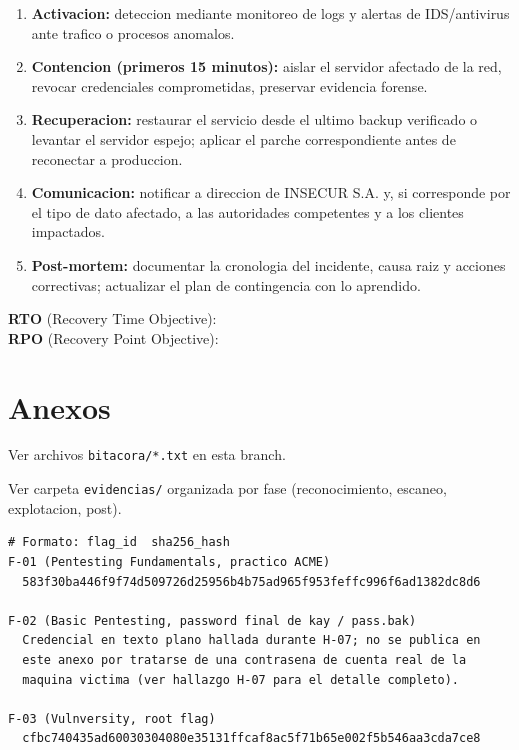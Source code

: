 \documentclass[11pt,a4paper]{article}
\begin{document}
\begin{campo}
\begin{enumerate}
  \item \textbf{Activacion:} deteccion mediante monitoreo de logs y alertas de IDS/antivirus ante trafico o procesos anomalos.
  \item \textbf{Contencion (primeros 15 minutos):} aislar el servidor afectado de la red, revocar credenciales comprometidas, preservar evidencia forense.
  \item \textbf{Recuperacion:} restaurar el servicio desde el ultimo backup verificado o levantar el servidor espejo; aplicar el parche correspondiente antes de reconectar a produccion.
  \item \textbf{Comunicacion:} notificar a direccion de INSECUR S.A. y, si corresponde por el tipo de dato afectado, a las autoridades competentes y a los clientes impactados.
  \item \textbf{Post-mortem:} documentar la cronologia del incidente, causa raiz y acciones correctivas; actualizar el plan de contingencia con lo aprendido.
\end{enumerate}
\end{campo}

\begin{campo}
\textbf{RTO} (Recovery Time Objective): \dotfill \\
\textbf{RPO} (Recovery Point Objective): \dotfill
\end{campo}

\section{Anexos}

\begin{campo}
Ver archivos \texttt{bitacora/*.txt} en esta branch.
\end{campo}

\begin{campo}
Ver carpeta \texttt{evidencias/} organizada por fase (reconocimiento, escaneo, explotacion, post).
\end{campo}

\begin{campo}
\begin{lstlisting}
# Formato: flag_id  sha256_hash
F-01 (Pentesting Fundamentals, practico ACME)
  583f30ba446f9f74d509726d25956b4b75ad965f953feffc996f6ad1382dc8d6

F-02 (Basic Pentesting, password final de kay / pass.bak)
  Credencial en texto plano hallada durante H-07; no se publica en
  este anexo por tratarse de una contrasena de cuenta real de la
  maquina victima (ver hallazgo H-07 para el detalle completo).

F-03 (Vulnversity, root flag)
  cfbc740435ad60030304080e35131ffcaf8ac5f71b65e002f5b546aa3cda7ce8
\end{lstlisting}
\end{campo}
\end{document}
